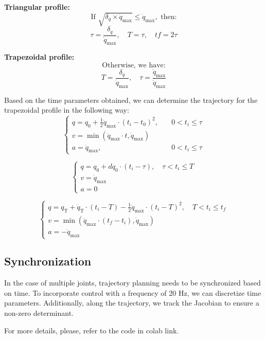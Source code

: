 \documentclass{article}
\begin{document}
\textbf{Triangular profile:}
\[
\text{If } \sqrt{\delta_q \times \ddot{q}_{\text{max}}} \leq \dot{q}_{\text{max}}, \text{ then:}
\]
\[
\tau = \frac{\delta_q}{\dot{q}_{\text{max}}}, \quad T = \tau, \quad tf = 2\tau
\]

\textbf{Trapezoidal profile:}
\[
\text{Otherwise, we have:}
\]
\[
T = \frac{\delta_q}{\dot{q}_{\text{max}}}, \quad \tau = \frac{\dot{q}_{\text{max}}}{\ddot{q}_{\text{max}}}
\]


Based on the time parameters obtained, we can determine the trajectory for the trapezoidal profile in the following way:
\[
\begin{cases}
q = q_0 + \frac{1}{2} \ddot{q}_{\text{max}} \cdot (t_i - t_0)^2, & \quad 0 < t_i \leq \tau \\
v = \min(\ddot{q}_{\text{max}} \cdot t, \dot{q}_{\text{max}}) \\
a = \ddot{q}_{\text{max}}, & \quad 0 < t_i \leq \tau
\end{cases}
\]


\[
\begin{cases}
q = q_0 + dq_0 \cdot (t_i - \tau), \quad \tau < t_i \leq T\\
v = \dot{q}_{\text{max}}\\
a = 0
\end{cases}
\]

\[
\begin{cases}
q = q_{\text{T}} + \dot{q}_{\text{T}} \cdot (t_i - T) - \frac{1}{2} \ddot{q}_{\text{max}} \cdot (t_i - T)^2, \quad T < t_i \leq t_f\\
v = \min(\ddot{q}_{\text{max}} \cdot (t_f - t_i), \dot{q}_{\text{max}})\\
a = -\ddot{q}_{\text{max}}
\end{cases}
\]

\subsection{Synchronization}
In the case of multiple joints, trajectory planning needs to be synchronized based on time.
To incorporate control with a frequency of 20 Hz, we can discretize time parameters.
Additionally, along the trajectory, we track the Jacobian to ensure a non-zero determinant.

For more details, please, refer to the code in colab link.
\end{document}
